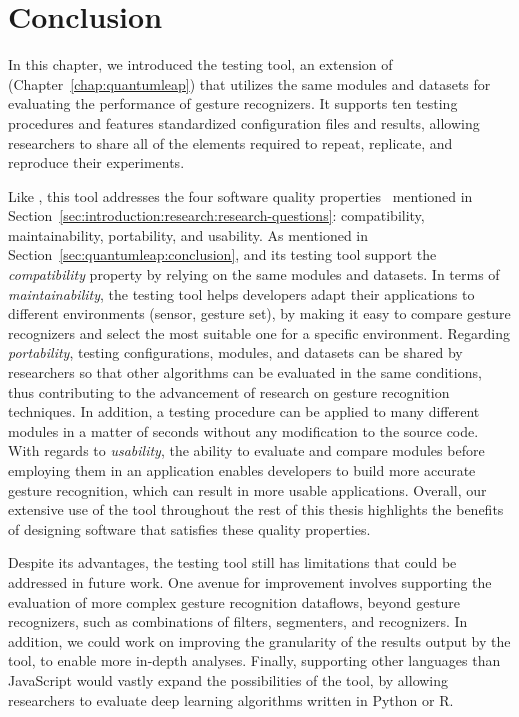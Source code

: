 \section{Conclusion} \label{sec:quantumleap-testing:conclusion}
In this chapter, we introduced the \ql testing tool, an extension of \ql (Chapter~\ref{chap:quantumleap}) that utilizes the same modules and datasets for evaluating the performance of gesture recognizers. It supports ten testing procedures and features standardized configuration files and results, allowing researchers to share all of the elements required to repeat, replicate, and reproduce their experiments.

Like \ql, this tool addresses the four software quality properties~\cite{iso25010} mentioned in Section~\ref{sec:introduction:research:research-questions}: compatibility, maintainability, portability, and usability.
%
As mentioned in Section~\ref{sec:quantumleap:conclusion}, \ql and its testing tool support the \textit{compatibility} property by relying on the same modules and datasets.
%
In terms of \textit{maintainability}, the \ql testing tool helps developers adapt their applications to different environments (sensor, gesture set), by making it easy to compare gesture recognizers and select the most suitable one for a specific environment.
%
Regarding \textit{portability}, \ql testing configurations, modules, and datasets can be shared by researchers so that other algorithms can be evaluated in the same conditions, thus contributing to the advancement of research on gesture recognition techniques. In addition, a testing procedure can be applied to many different modules in a matter of seconds without any modification to the source code.
%
With regards to \textit{usability}, the ability to evaluate and compare modules before employing them in an application enables developers to build more accurate gesture recognition, which can result in more usable applications.
%
Overall, our extensive use of the tool throughout the rest of this thesis highlights the benefits of designing software that satisfies these quality properties.

Despite its advantages, the \ql testing tool still has limitations that could be addressed in future work.
%
One avenue for improvement involves supporting the evaluation of more complex gesture recognition dataflows, beyond gesture recognizers, such as combinations of filters, segmenters, and recognizers.
%
In addition, we could work on improving the granularity of the results output by the tool, to enable more in-depth analyses.
%
Finally, supporting other languages than JavaScript would vastly expand the possibilities of the tool, \eg by allowing researchers to evaluate deep learning algorithms written in Python or R.

